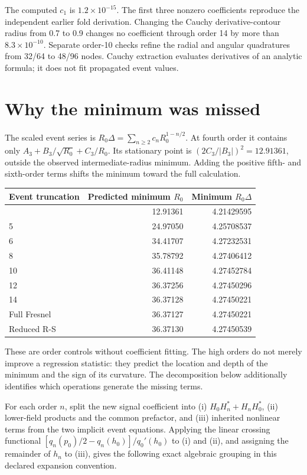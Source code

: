 \documentclass[11pt]{article}
\begin{document}
The computed \(c_1\) is \(1.2\times10^{-15}\). The first three nonzero
coefficients reproduce the independent earlier fold derivation. Changing
the Cauchy derivative-contour radius from 0.7 to 0.9 changes no
coefficient through order 14 by more than \(8.3\times10^{-10}\).
Separate order-10 checks refine the radial and angular quadratures from
32/64 to 48/96 nodes. Cauchy extraction evaluates derivatives of an
analytic formula; it does not fit propagated event values.

\section{Why the minimum was missed}\label{why-the-minimum-was-missed}

The scaled event series is \(R_0\Delta=\sum_{n\geq2}c_n R_0^{1-n/2}\).
At fourth order it contains only \(A_3+B_3/\sqrt{R_0}+C_3/R_0\). Its
stationary point is \((2C_3/|B_3|)^2=12.91361\), outside the observed
intermediate-radius minimum. Adding the positive fifth- and sixth-order
terms shifts the minimum toward the full calculation.

\begin{longtable}[]{@{}lrr@{}}
\toprule\noalign{}
Event truncation & Predicted minimum \(R_0\) & Minimum \(R_0\Delta\) \\
\midrule\noalign{}
\endhead
\bottomrule\noalign{}
\endlastfoot
4 & 12.91361 & 4.21429595 \\
5 & 24.97050 & 4.25708537 \\
6 & 34.41707 & 4.27232531 \\
8 & 35.78792 & 4.27406412 \\
10 & 36.41148 & 4.27452784 \\
12 & 36.37256 & 4.27450296 \\
14 & 36.37128 & 4.27450221 \\
Full Fresnel & 36.37127 & 4.27450221 \\
Reduced R-S & 36.37130 & 4.27450539 \\
\end{longtable}

These are order controls without coefficient fitting. The high orders do
not merely improve a regression statistic: they predict the location and
depth of the minimum and the sign of its curvature. The decomposition
below additionally identifies which operations generate the missing
terms.

For each order \(n\), split the new signal coefficient into (i)
\(H_0H_n^*+H_nH_0^*\), (ii) lower-field products and the common
prefactor, and (iii) inherited nonlinear terms from the two implicit
event equations. Applying the linear crossing functional
\([q_n(p_0)/2-q_n(h_0)]/q_0'(h_0)\) to (i) and (ii), and assigning the
remainder of \(h_n\) to (iii), gives the following exact algebraic
grouping in this declared expansion convention.
\end{document}
